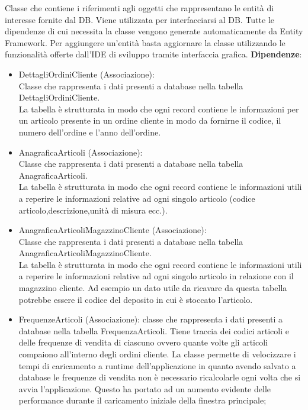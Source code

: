 Classe che contiene i riferimenti agli oggetti che rappresentano le entità di interesse fornite dal DB.
Viene utilizzata per interfacciarsi al DB.
Tutte le dipendenze di cui necessita la classe vengono generate automaticamente da Entity Framework. Per aggiungere un'entità basta aggiornare
la classe utilizzando le funzionalità offerte dall'IDE di sviluppo tramite interfaccia grafica.
\textbf{Dipendenze}:
\begin{itemize}
    \item DettagliOrdiniCliente (Associazione): \\
    Classe che rappresenta i dati presenti a database nella tabella DettagliOrdiniCliente.\\
    La tabella è strutturata in modo che ogni record contiene le informazioni per un articolo presente in un ordine cliente in modo da
    fornirne il codice, il numero dell'ordine e l'anno dell'ordine.
    \item AnagraficaArticoli (Associazione): \\
    Classe che rappresenta i dati presenti a database nella tabella AnagraficaArticoli.\\
    La tabella è strutturata in modo che ogni record contiene le informazioni utili a reperire le informazioni relative ad ogni singolo articolo (codice articolo,descrizione,unità di misura ecc.).
    \item AnagraficaArticoliMagazzinoCliente (Associazione): \\
    Classe che rappresenta i dati presenti a database nella tabella AnagraficaArticoliMagazzinoCliente.\\
    La tabella è strutturata in modo che ogni record contiene le informazioni utili a reperire le informazioni relative ad ogni singolo articolo in relazione con il magazzino cliente.
    Ad esempio un dato utile da ricavare da questa tabella potrebbe essere il codice del deposito in cui è stoccato l'articolo.
    \item FrequenzeArticoli (Associazione): classe che rappresenta i dati presenti a database nella tabella FrequenzaArticoli.
    Tiene traccia dei codici articoli e delle frequenze di vendita di ciascuno ovvero quante volte gli articoli compaiono all'interno degli 
    ordini cliente. La classe permette di velocizzare i tempi di caricamento a runtime dell'applicazione in quanto avendo salvato a database
    le frequenze di vendita non è necessario ricalcolarle ogni volta che si avvia l'applicazione. Questo ha portato ad un aumento evidente delle 
    performance durante il caricamento iniziale della finestra principale;\\

\end{itemize}
